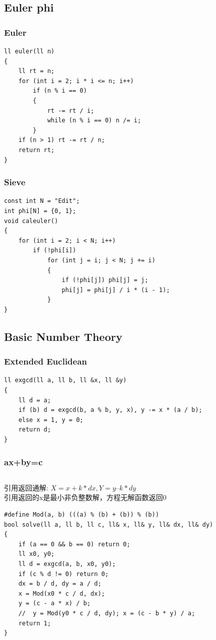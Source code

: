 \documentclass[twoside]{article}
\begin{document}
\subsection{Euler phi}
\subsubsection{Euler}
\begin{lstlisting}
ll euler(ll n)
{
    ll rt = n;
    for (int i = 2; i * i <= n; i++)
        if (n % i == 0)
        {
            rt -= rt / i;
            while (n % i == 0) n /= i;
        }
    if (n > 1) rt -= rt / n;
    return rt;
}
\end{lstlisting}
\subsubsection{Sieve}
\begin{lstlisting}
const int N = "Edit";
int phi[N] = {0, 1};
void caleuler()
{
    for (int i = 2; i < N; i++)
        if (!phi[i])
            for (int j = i; j < N; j += i)
            {
                if (!phi[j]) phi[j] = j;
                phi[j] = phi[j] / i * (i - 1);
            }
}
\end{lstlisting}
\subsection{Basic Number Theory}
\subsubsection{Extended Euclidean}
\begin{lstlisting}
ll exgcd(ll a, ll b, ll &x, ll &y)
{
    ll d = a;
    if (b) d = exgcd(b, a % b, y, x), y -= x * (a / b);
    else x = 1, y = 0;
    return d;
}
\end{lstlisting}
\subsubsection{ax+by=c}
\begin{lstlisting}
\end{lstlisting}
引用返回通解: $X = x + k * dx, Y = y – k * dy$\\
引用返回的x是最小非负整数解，方程无解函数返回0
\begin{lstlisting}
#define Mod(a, b) (((a) % (b) + (b)) % (b))
bool solve(ll a, ll b, ll c, ll& x, ll& y, ll& dx, ll& dy)
{
    if (a == 0 && b == 0) return 0;
    ll x0, y0;
    ll d = exgcd(a, b, x0, y0);
    if (c % d != 0) return 0;
    dx = b / d, dy = a / d;
    x = Mod(x0 * c / d, dx);
    y = (c - a * x) / b;
    //  y = Mod(y0 * c / d, dy); x = (c - b * y) / a;
    return 1;
}
\end{lstlisting}
\end{document}
